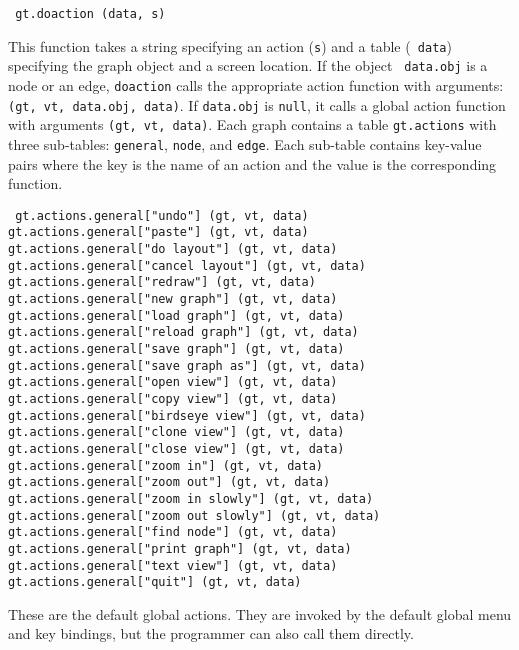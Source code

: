 \begin{flushleft}\tt
gt.doaction (data, s)\\
\end{flushleft}\vspace{-2\itemsep}
This function takes a string specifying an action ({\tt s}) and a table ({\tt
data}) specifying the graph object and a screen location. If the object {\tt
data.obj} is a node or an edge, {\tt doaction} calls the appropriate action
function with arguments: {\tt (gt, vt, data.obj, data)}.  If {\tt data.obj} is
{\tt null}, it calls a global action function with arguments {\tt (gt, vt,
data)}. Each graph contains a table {\tt gt.actions} with three sub-tables:
{\tt general}, {\tt node}, and {\tt edge}.  Each sub-table contains key-value
pairs where the key is the name of an action and the value is the corresponding
function.

\begin{flushleft}\tt
gt.actions.general["undo"] (gt, vt, data)\\
gt.actions.general["paste"] (gt, vt, data)\\
gt.actions.general["do layout"] (gt, vt, data)\\
gt.actions.general["cancel layout"] (gt, vt, data)\\
gt.actions.general["redraw"] (gt, vt, data)\\
gt.actions.general["new graph"] (gt, vt, data)\\
gt.actions.general["load graph"] (gt, vt, data)\\
gt.actions.general["reload graph"] (gt, vt, data)\\
gt.actions.general["save graph"] (gt, vt, data)\\
gt.actions.general["save graph as"] (gt, vt, data)\\
gt.actions.general["open view"] (gt, vt, data)\\
gt.actions.general["copy view"] (gt, vt, data)\\
gt.actions.general["birdseye view"] (gt, vt, data)\\
gt.actions.general["clone view"] (gt, vt, data)\\
gt.actions.general["close view"] (gt, vt, data)\\
gt.actions.general["zoom in"] (gt, vt, data)\\
gt.actions.general["zoom out"] (gt, vt, data)\\
gt.actions.general["zoom in slowly"] (gt, vt, data)\\
gt.actions.general["zoom out slowly"] (gt, vt, data)\\
gt.actions.general["find node"] (gt, vt, data)\\
gt.actions.general["print graph"] (gt, vt, data)\\
gt.actions.general["text view"] (gt, vt, data)\\
gt.actions.general["quit"] (gt, vt, data)\\
\end{flushleft}\vspace{-2\itemsep}
These are the default global actions. They are invoked by the default global
menu and key bindings, but the programmer can also call them directly.

